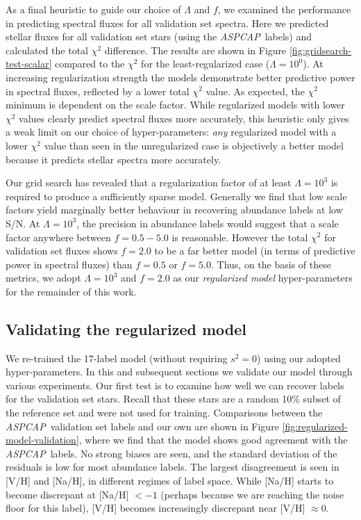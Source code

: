 \documentclass[12pt,preprint]{aastex}
\newcommand{\project}[1]{\textsl{#1}}
\newcommand{\acronym}[1]{{\small{#1}}}
\newcommand{\aspcap}{\project{\acronym{ASPCAP}}}
\begin{document}
As a final heuristic to guide our choice of $\Lambda$ and $f$, we examined the
performance in predicting spectral fluxes for all validation set spectra.  Here 
we predicted stellar fluxes for all validation set stars (using the \aspcap\ 
labels) and calculated the total $\chi^2$ difference.  The results are shown in
Figure \ref{fig:gridsearch-test-scalar} compared to the $\chi^2$ for the least-regularized case ($\Lambda = 10^0$).  At increasing regularization strength
the models demonstrate better predictive power in spectral fluxes, reflected by
a lower total $\chi^2$ value.  As expected, the $\chi^2$ minimum is dependent on
the scale factor.  While regularized models with lower $\chi^2$ values clearly
predict spectral fluxes more accurately, this heuristic only gives a weak limit
on our choice of hyper-parameters: \emph{any} regularized model with a lower
$\chi^2$ value than seen in the unregularized case is objectively a better model 
because it predicts stellar spectra more accurately.


Our grid search has revealed that a regularization factor of at least $\Lambda = 10^3$ is
required to produce a sufficiently sparse model.  Generally we find that low
scale factors yield marginally better behaviour in recovering abundance labels
at low S/N.  At $\Lambda = 10^3$, the precision in abundance labels would 
suggest that a scale factor anywhere between $f = 0.5-5.0$ is reasonable. 
However the total $\chi^2$ for validation set fluxes shows $f = 2.0$ to be a far
better model (in terms of predictive power in spectral fluxes) than $f = 0.5$
or $f = 5.0$.  Thus, on the basis of these metrics, we adopt $\Lambda = 10^3$
and $f = 2.0$ as our \emph{regularized model} hyper-parameters for the
remainder of this work.


\subsection{Validating the regularized model}
\label{sec:model-validation}


We re-trained the 17-label model (without requiring $s^2 = 0$) using our adopted
hyper-parameters.  In this and subsequent sections we validate our model through
various experiments.  Our first test is to examine how well we can recover
labels for the validation set stars.  Recall that these stars are a random 10\%
subset of the reference set and were not used for training.  Comparisons between
the \aspcap\ validation set labels and our own are shown in Figure
\ref{fig:regularized-model-validation}, where we find that the model shows good
agreement with the \aspcap\ labels.  No strong biases are seen, and the standard
deviation of the residuals is low for most abundance labels.  The largest
disagreement is seen in [V/H] and [Na/H], in different regimes of label space.
While [Na/H] starts to become discrepant at [Na/H] $< -1$ (perhaps because we
are reaching the noise floor for this label), [V/H] becomes increasingly discrepant
near [V/H] $\approx 0$. 
\end{document}
